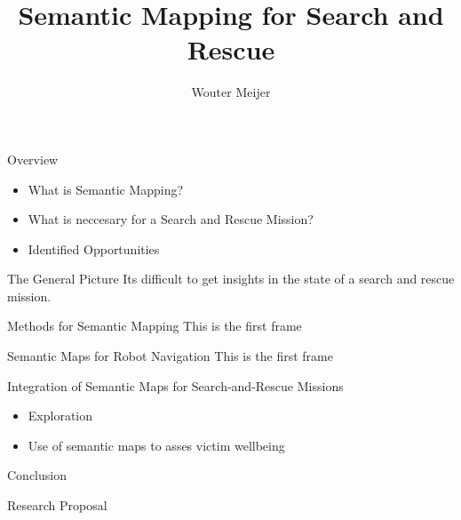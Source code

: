 \documentclass{beamer}
\title[]{Semantic Mapping for Search and Rescue}
\institute[]{Delft University of Technology, The Netherlands}
\author{Wouter Meijer}
\begin{document}
{
\frame{\titlepage}
}

{

}

\begin{frame}{Overview}
    \begin{block}{}
        \begin{itemize}
        \item What is Semantic Mapping?
        \item What is neccesary for a Search and Rescue Mission?
        \item Identified Opportunities
        \end{itemize}
    \end{block}
\end{frame}


\begin{frame}{The General Picture}
    Its difficult to get insights in the state of  a search and rescue mission.
\end{frame}


\begin{frame}{Methods for Semantic Mapping}
    This is the first frame
\end{frame}


\begin{frame}{Semantic Maps for Robot Navigation}
    This is the first frame
\end{frame}


\begin{frame}{Integration of Semantic Maps for Search-and-Rescue Missions}
    \begin{block}{}
        \begin{itemize}
        \item Exploration
        \item Use of semantic maps to asses victim wellbeing
        \end{itemize}
    \end{block}
\end{frame}


\begin{frame}{Conclusion}
    
\end{frame}

\begin{frame}{Research Proposal}
    
\end{frame}
\end{document}
